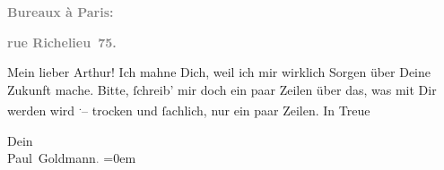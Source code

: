 \pstart
           \begin{otherlanguage}{french}\textcolor{gray}{\textbf{\textbf{Bureaux à Paris:}}}\end{otherlanguage}\pend
           
\pstart
           \begin{otherlanguage}{french}\textcolor{gray}{\textbf{\textbf{rue Richelieu 75.}}}\end{otherlanguage}\pend
           
\pstart\center{}Mein lieber Arthur!\pend\vspace{0.5em}
\pstart
           Ich mahne Dich, weil ich mir wirklich Sorgen über Deine Zukunft mache. Bitte,
               ſchreib’ mir doch ein paar Zeilen über das, was mit Dir werden wird \substVorne{}\textsuperscript{.}\substDazwischen{}–\substHinten{} trocken und ſachlich, nur ein paar Zeilen. In Treue\pend
           
\pstart
           Dein {\\[\baselineskip]}\spacefill\mbox{Paul Goldmann\textcolor{gray}{.}}\pend
           \leftskip=0em{}\endnumbering{}  
      